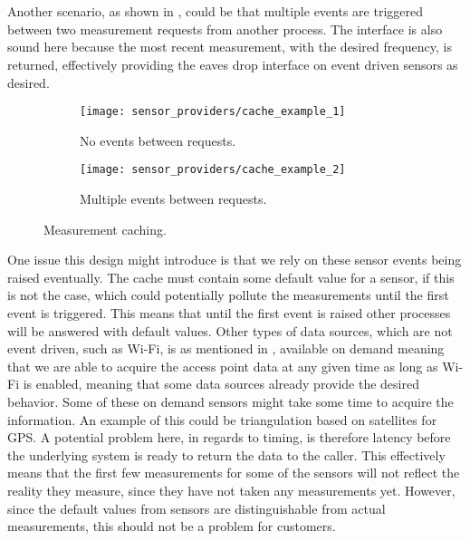 \\\\
Another scenario, as shown in , could be that multiple events are triggered between two measurement requests from another process. The interface is also sound here because the most recent measurement, with the desired frequency, is returned, effectively providing the eaves drop interface on event driven sensors as desired.

\begin{figure}[!htbp]
\begin{subfigure}[!t]{.5\textwidth}
  \centering
  \texttt{[image: sensor\_providers/cache\_example\_1]}
  \caption{No events between requests.}
  \label{fig:cache_no_event_between}
\end{subfigure}
\begin{subfigure}[!t]{.5\textwidth}
  \centering
  \texttt{[image: sensor\_providers/cache\_example\_2]}
  \caption{Multiple events between requests.}
  \label{fig:cache_multiple_event_between}
\end{subfigure}
\caption{Measurement caching.}
\label{fig:cache_examples}
\end{figure}
\FloatBarrier

One issue this design might introduce is that we rely on these sensor events being raised eventually. The cache must contain some default value for a sensor, if this is not the case, which could potentially pollute the measurements until the first event is triggered. This means that until the first event is raised other processes will be answered with default values. Other types of data sources, which are not event driven, such as Wi-Fi, is as mentioned in , available on demand meaning that we are able to acquire the access point data at any given time as long as Wi-Fi is enabled, meaning that some data sources already provide the desired behavior. Some of these on demand sensors might take some time to acquire the information. An example of this could be triangulation based on satellites for GPS. A potential problem here, in regards to timing, is therefore latency before the underlying system is ready to return the data to the caller. This effectively means that the first few measurements for some of the sensors will not reflect the reality they measure, since they have not taken any measurements yet. However, since the default values from sensors are distinguishable from actual measurements, this should not be a problem for customers.

